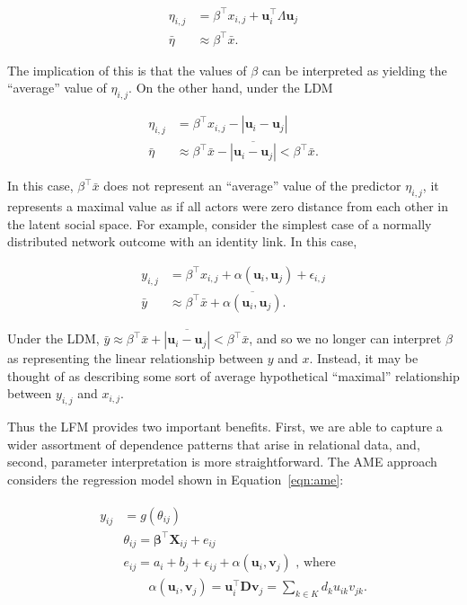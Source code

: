 \documentclass[12pt,pdflatex]{elsarticle}
\begin{document}
\begin{align*}
	\eta_{i,j} & =  \beta^\top x_{i,j} + \textbf{u}_{i}^{\top} \Lambda \textbf{u}_{j} \\
	\bar \eta & \approx  \beta^\top \bar x.
\end{align*}

The implication of this is that the values of $\beta$ can be interpreted as yielding the ``average'' value of $\eta_{i,j}$. On the other hand, under the LDM

\begin{align*}
	\eta_{i,j} & =  \beta^\top x_{i,j} - |\textbf{u}_{i} - \textbf{u}_{j}|  \\
	\bar \eta & \approx  \beta^\top \bar x - \overline{ |\textbf{u}_{i} - \textbf{u}_{j}| } <  \beta^\top \bar x .
\end{align*}

In this case, $\beta^\top \bar x$ does not represent an ``average'' value of the predictor $\eta_{i,j}$, it represents a maximal value as if all actors were zero distance from each other in the latent social space. For example, consider the simplest case of a normally distributed network  outcome with an identity link. In this case,

\begin{align*}
	y_{i,j} & = \beta^\top x_{i,j} + \alpha(\textbf{u}_{i}, \textbf{u}_{j}) + \epsilon_{i,j} \\
	\bar y & \approx \beta^\top \bar x + \overline{ \alpha(\textbf{u}_{i}, \textbf{u}_{j}) }   .
\end{align*}

Under the LDM, $\bar y \approx \beta^\top \bar x + \overline{ |\textbf{u}_{i} - \textbf{u}_{j}|  } < \beta^\top \bar x$, and so we no longer can interpret $\beta$ as representing the linear relationship between $y$ and $x$. Instead, it may be thought of as describing some sort of average hypothetical ``maximal'' relationship between $y_{i,j}$ and $x_{i,j}$.

Thus the LFM provides two important benefits. First, we are able to capture a wider assortment of dependence patterns that arise in relational data, and, second, parameter interpretation is more straightforward. The AME approach considers the regression model shown in Equation~\ref{eqn:ame}:

\begin{align}
\begin{aligned}
	y_{ij} &= g(\theta_{ij}) \\
	&\theta_{ij} = \bm\beta^{\top} \mathbf{X}_{ij} + e_{ij} \\
	&e_{ij} = a_{i} + b_{j}  + \epsilon_{ij} + \alpha(\textbf{u}_{i}, \textbf{v}_{j}) \text{  , where } \\
	&\qquad \alpha(\textbf{u}_{i}, \textbf{v}_{j}) = \textbf{u}_{i}^{\top} \textbf{D} \textbf{v}_{j} = \sum_{k \in K} d_{k} u_{ik} v_{jk}. \\
\label{eqn:ame}
\end{aligned}
\end{align}
\end{document}
